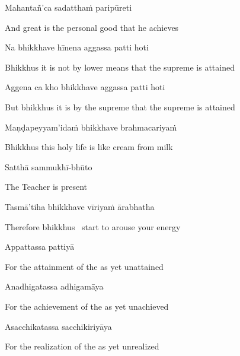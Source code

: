 Mahantañ'ca sadatthaṁ paripūreti

\begin{english}
  And great is the personal good that he achieves
\end{english}

Na bhikkhave hīnena aggassa patti hoti

\begin{english}
  Bhikkhus it is not by lower means that the supreme is attained
\end{english}

Aggena ca kho bhikkhave aggassa patti hoti

\begin{english}
  But bhikkhus it is by the supreme that the supreme is attained
\end{english}

Maṇḍapeyyam'idaṁ bhikkhave brahmacariyaṁ

\begin{english}
  Bhikkhus this holy life is like cream from milk\makeatletter\hyperlink{endnote89-appendix}\makeatother
\end{english}

Satthā sammukhī-bhūto

\begin{english}
  The Teacher is present
\end{english}

Tasmā'tiha bhikkhave vīriyaṁ ārabhatha

\begin{english}
  Therefore bhikkhus \breathmark\ start to arouse your energy
\end{english}

Appattassa pattiyā

\begin{english}
  For the attainment of the as yet unattained
\end{english}

Anadhigatassa adhigamāya

\begin{english}
  For the achievement of the as yet unachieved
\end{english}

Asacchikatassa sacchikiriyāya

\begin{english}
  For the realization of the as yet unrealized
\end{english}


